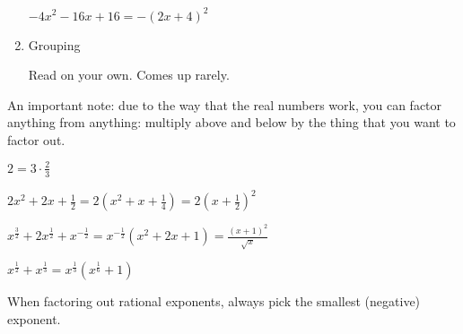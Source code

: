 \documentclass[letterpaper,12pt,fleqn]{article}
\begin{document}
\begin{enumerate}
\begin{example}
    $-4x^2-16x+16=-(2x+4)^2$
  \end{example}


\item Grouping

  Read on your own. Comes up rarely.
\end{enumerate}

An important note: due to the way that the real numbers work, you can factor
anything from anything: multiply above and below by the thing that you want
to factor out.

\begin{example}
  $2=3\cdot\frac{2}{3}$

  $2x^2+2x+\frac{1}{2}=2(x^2+x+\frac{1}{4})=2(x+\frac{1}{2})^2$

  $x^{\frac{3}{2}}+2x^{\frac{1}{2}}+x^{-\frac{1}{2}}=x^{-\frac{1}{2}}(x^2+2x+1)=
  \frac{(x+1)^2}{\sqrt{x}}$

  $x^{\frac{1}{2}}+x^{\frac{1}{3}}=x^{\frac{1}{3}}(x^{\frac{1}{6}}+1)$
\end{example}

When factoring out rational exponents, always pick the smallest (negative)
exponent.
\end{document}
